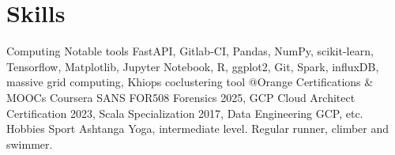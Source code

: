 \documentclass[]{friggeri-cv}
\begin{document}
\section{Skills}
\vspace{-0.5em}

\begin{entrylist}
  \entry
  {Computing}
  {Notable tools}
  {}
  {FastAPI, Gitlab-CI, Pandas, NumPy, scikit-learn, Tensorflow, Matplotlib, Jupyter Notebook, R, ggplot2, Git, Spark, influxDB, massive grid computing, Khiops coclustering tool @Orange}
  \entry
  {}
  {Certifications \& MOOCs Coursera}
  {}
  {SANS FOR508 Forensics 2025, GCP Cloud Architect Certification 2023, Scala Specialization 2017, Data Engineering GCP, etc.}
  \entry
  {Hobbies}
  {Sport}
  {}
  {Ashtanga Yoga, intermediate level. Regular runner, climber and swimmer.}
  \vspace{-2.5em}

\end{entrylist}
\end{document}

